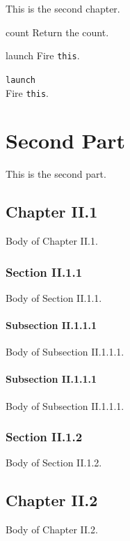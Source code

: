 \documentclass[openright,twoside,11pt]{book}
\begin{document}
This is the second chapter.



\begin{urbiscriptapi}
\item[count]Return the count.
\item[launch]
  Fire \lstinline|this|.
\item \lstinline|launch|~\\
  Fire \lstinline|this|.

\end{urbiscriptapi}

\part{Second Part}

This is the second part.

\chapter{Chapter II.1}
Body of Chapter II.1.

\section{Section II.1.1}
Body of Section II.1.1.

\subsection{Subsection II.1.1.1}
Body of Subsection II.1.1.1.

\subsection{Subsection II.1.1.1}
Body of Subsection II.1.1.1.

\section{Section II.1.2}
Body of Section II.1.2.

\chapter{Chapter II.2}
Body of Chapter II.2.
\end{document}
